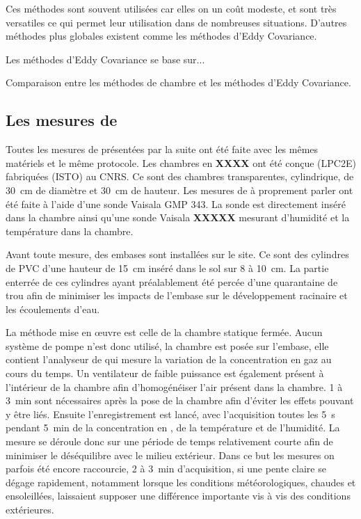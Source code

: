 Ces méthodes sont souvent utilisées car elles on un coût modeste, et sont très versatiles ce qui permet leur utilisation dans de nombreuses situations.
D'autres méthodes plus globales existent comme les méthodes d'Eddy Covariance.

Les méthodes d'Eddy Covariance se base sur...

Comparaison entre les méthodes de chambre et les méthodes d'Eddy Covariance.

\subsection{Les mesures de \coo}

Toutes les mesures de \coo présentées par la suite ont été faite avec les mêmes matériels et le même protocole.
Les chambres en \textbf{XXXX} ont été conçue (LPC2E) fabriquées (ISTO) au CNRS.
Ce sont des chambres transparentes, cylindrique, de \SI{30}{\centi\metre} de diamètre et \SI{30}{\centi\metre} de hauteur.
Les mesures de \coo à proprement parler ont été faite à l'aide d'une sonde Vaisala GMP 343\textregistered.
La sonde est directement inséré dans la chambre ainsi qu'une sonde Vaisala \textbf{XXXXX} mesurant d'humidité et la température dans la chambre.

Avant toute mesure, des embases sont installées sur le site.
Ce sont des cylindres de PVC d'une hauteur de \SI{15}{\centi\metre} inséré dans le sol sur 8 à \SI{10}{\centi\metre}.
La partie enterrée de ces cylindres ayant préalablement été percée d'une quarantaine de trou afin de minimiser les impacts de l'embase sur le développement racinaire et les écoulements d'eau.

La méthode mise en œuvre est celle de la chambre statique fermée.
Aucun système de pompe n'est donc utilisé, la chambre est posée sur l'embase, elle contient l'analyseur de \coo qui mesure la variation de la concentration en gaz au cours du temps.
Un ventilateur de faible puissance est également présent à l'intérieur de la chambre afin d'homogénéiser l'air présent dans la chambre.
1 à \SI{3}{\minute} sont nécessaires après la pose de la chambre afin d'éviter les effets pouvant y être liés.
Ensuite l’enregistrement est lancé, avec l'acquisition toutes les \SI{5}{\second} pendant \SI{5}{\minute} de la concentration en \coo, de la température et de l'humidité.
La mesure se déroule donc sur une période de temps relativement courte afin de minimiser le déséquilibre avec le milieu extérieur.
Dans ce but les mesures on parfois été encore raccourcie, 2 à \SI{3}{\minute} d'acquisition, si une pente claire se dégage rapidement, notamment lorsque les conditions météorologiques, chaudes et ensoleillées, laissaient supposer une différence importante vis à vis des conditions extérieures.

